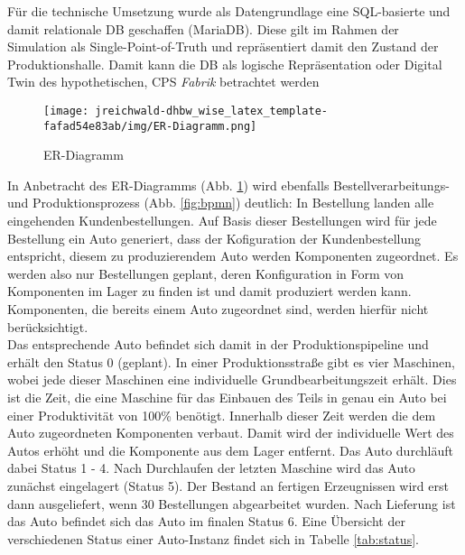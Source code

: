 Für die technische Umsetzung wurde als Datengrundlage eine SQL-basierte und damit relationale \ac{DB} geschaffen (MariaDB). Diese gilt im Rahmen der Simulation als Single-Point-of-Truth und repräsentiert damit den Zustand der Produktionshalle. Damit kann die \ac{DB} als logische Repräsentation oder Digital Twin des hypothetischen, \ac{CPS} \textit{Fabrik} betrachtet werden
\begin{figure}[H]
    \centering
    \texttt{[image: jreichwald-dhbw\_wise\_latex\_template-fafad54e83ab/img/ER-Diagramm.png]}
    \caption{ER-Diagramm}
    \label{fig:er}
\end{figure}
In Anbetracht des ER-Diagramms (Abb. \ref{fig:er}) wird ebenfalls Bestellverarbeitungs- und Produktionsprozess (Abb. \ref{fig:bpmn}) deutlich: In Bestellung landen alle eingehenden Kundenbestellungen. Auf Basis dieser Bestellungen wird für jede Bestellung ein Auto generiert, dass der Kofiguration der Kundenbestellung entspricht, diesem zu produzierendem Auto werden Komponenten zugeordnet. Es werden also nur Bestellungen geplant, deren Konfiguration in Form von Komponenten im Lager zu finden ist und damit produziert werden kann. Komponenten, die bereits einem Auto zugeordnet sind, werden hierfür nicht berücksichtigt.
\\Das entsprechende Auto befindet sich damit in der Produktionspipeline und erhält den Status 0 (geplant).
In einer Produktionsstraße gibt es vier Maschinen, wobei jede dieser Maschinen eine individuelle Grundbearbeitungszeit erhält. Dies ist die Zeit, die eine Maschine für das Einbauen des Teils in genau ein Auto bei einer Produktivität von 100\% benötigt. Innerhalb dieser Zeit werden die dem Auto zugeordneten Komponenten verbaut. Damit wird der individuelle Wert des Autos erhöht und die Komponente aus dem Lager entfernt. Das Auto durchläuft dabei Status 1 - 4. Nach Durchlaufen der letzten Maschine wird das Auto zunächst eingelagert (Status 5). Der Bestand an fertigen Erzeugnissen wird erst dann ausgeliefert, wenn 30 Bestellungen abgearbeitet wurden. Nach Lieferung ist das Auto befindet sich das Auto im finalen Status 6.
Eine Übersicht der verschiedenen Status einer Auto-Instanz findet sich in Tabelle \ref{tab:status}.
